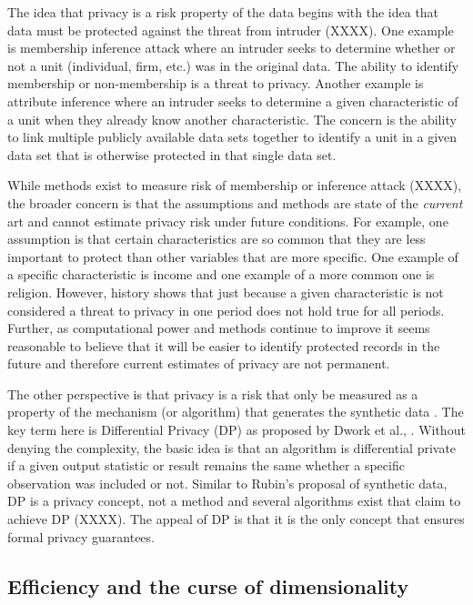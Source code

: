 \documentclass[runningheads]{llncs}
\begin{document}
The idea that privacy is a risk property of the data begins with the idea that data must be protected against the threat from intruder (XXXX).  One example is membership inference attack where an intruder seeks to determine whether or not a unit (individual, firm, etc.) was in the original data.  The ability to identify membership or non-membership is a threat to privacy.  Another example is attribute inference where an intruder seeks to determine a given characteristic of a unit when they already know another characteristic.  The concern is the ability to link multiple publicly available data sets together to identify a unit in a given data set that is otherwise protected in that single data set.  

While methods exist to measure risk of membership or inference attack (XXXX), the broader concern is that the assumptions and methods are state of the \emph{current} art and cannot estimate privacy risk under future conditions.  For example, one assumption is that certain characteristics are so common that they are less important to protect than other variables that are more specific.  One example of a specific characteristic is income and one example of a more common one is religion.  However, history shows that just because a given characteristic is not considered a threat to privacy in one period does not hold true for all periods.  Further, as computational power and methods continue to improve it seems reasonable to believe that it will be easier to identify protected records in the future and therefore current estimates of privacy are not permanent.

The other perspective is that privacy is a risk that only be measured as a property of the mechanism (or algorithm) that generates the synthetic data \cite{jordon2022synthetic}.  The key term here is Differential Privacy (DP) as proposed by Dwork et al., \cite{dwork2006calibrating}.  Without denying the complexity, the basic idea is that an algorithm is differential private if a given output statistic or result remains the same whether a specific observation was included or not.  Similar to Rubin's proposal of synthetic data, DP is a privacy concept, not a method and several algorithms exist that claim to achieve DP (XXXX).  The appeal of DP is that it is the only concept that ensures formal privacy guarantees.

\subsection{Efficiency and the curse of dimensionality}
\end{document}
